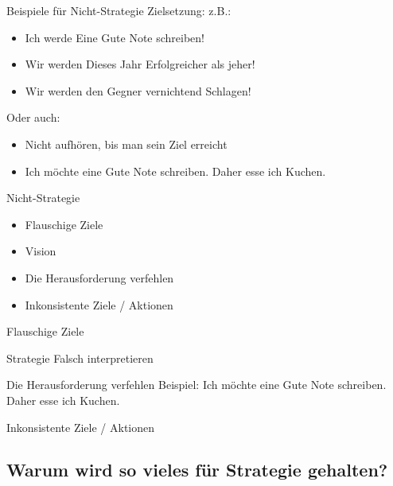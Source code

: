 \documentclass[12pt,compress,ngerman,utf8,t]{beamer}
\begin{document}
\begin{frame}[c]{Beispiele für Nicht-Strategie}
    Zielsetzung: z.B.: \pause
    \begin{itemize}
        \item Ich werde Eine Gute Note schreiben! \pause
        \item Wir werden Dieses Jahr Erfolgreicher als jeher! \pause
        \item Wir werden den Gegner vernichtend Schlagen! \pause
    \end{itemize}

    Oder auch:
    \begin{itemize}
        \item Nicht aufhören, bis man sein Ziel erreicht \pause
        \item Ich möchte eine Gute Note schreiben. Daher esse ich Kuchen.
    \end{itemize}
\end{frame}

\begin{frame}[c]{Nicht-Strategie}
    \large
    \begin{itemize}
        \item Flauschige Ziele \pause
        \item Vision \pause
        \item Die Herausforderung verfehlen \pause
        \item Inkonsistente Ziele / Aktionen \pause
    \end{itemize}
\end{frame}


\begin{frame}{Flauschige Ziele}
    
\end{frame}


\begin{frame}{Strategie Falsch interpretieren}
    
\end{frame}


\begin{frame}{Die Herausforderung verfehlen}
    Beispiel: Ich möchte eine Gute Note schreiben. Daher esse ich Kuchen.
\end{frame}


\begin{frame}{Inkonsistente Ziele / Aktionen}
    
\end{frame}


\subsection{Warum wird so vieles für Strategie gehalten?}
\end{document}
